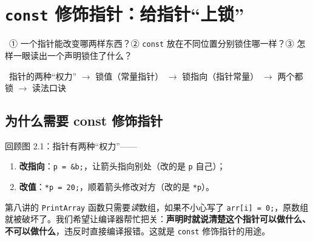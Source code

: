 \documentclass[UTF8,a4paper,11pt,fontset=none,zihao=-4]{ctexart}
\newcommand{\ci}[1]{{\circfont #1}}
\newcommand{\cpp}[1]{\lstinline[style=cpp,basicstyle=\ttfamily,numbers=none]{#1}}
\newcommand{\cc}[1]{\texttt{#1}}
\begin{document}

\section{\texorpdfstring{\texttt{const} 修饰指针：给指针“上锁”}{const 修饰指针：给指针上锁}}\label{sec:const}
\ \ci{①} 一个指针能改变哪两样东西？\ci{②} \cc{const} 放在不同位置分别锁住哪一样？\ci{③} 怎样一眼读出一个声明锁住了什么？\par
{}\ 指针的两种“权力” $\to$ 锁值（常量指针） $\to$ 锁指向（指针常量） $\to$ 两个都锁 $\to$ 读法口诀

\subsection{为什么需要 const 修饰指针}
回顾图 2.1：指针有两种“权力”——
\begin{enumerate}[label=(\roman*)]
  \item \textbf{改指向}：\cpp{p = &b;}，让箭头指向别处（改的是 \cc{p} 自己）；
  \item \textbf{改值}：\cpp{*p = 20;}，顺着箭头修改对方（改的是 \cc{*p}）。
\end{enumerate}
第八讲的 \cc{PrintArray} 函数只需要\emph{读}数组，如果不小心写了 \cpp{arr[i] = 0;}，原数组就被破坏了。我们希望让编译器帮忙把关：\textbf{声明时就说清楚这个指针可以做什么、不可以做什么}，违反时直接编译报错。这就是 \cc{const} 修饰指针的用途。
\end{document}
